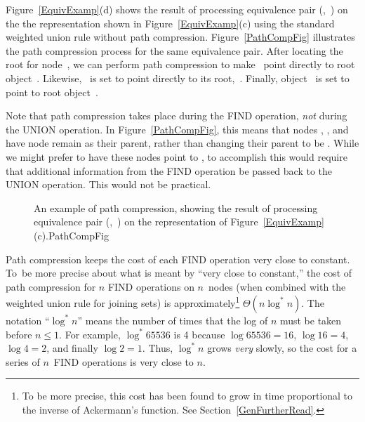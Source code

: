 \begin{example}
Figure~\ref{EquivExamp}(d) shows the result of processing equivalence
pair (,~) on the the representation shown in
Figure~\ref{EquivExamp}(c) using the standard weighted union rule
without path compression.
Figure~\ref{PathCompFig} illustrates the path compression process for
the same equivalence pair.
After locating the root for node~, we can perform path
compression to make~ point directly to root object~.
Likewise, ~is set to point directly to its root,~.
Finally, object~ is set to point to root object~.

Note that path compression takes place during the
FIND operation, \emph{not} during the UNION operation.
In Figure~\ref{PathCompFig}, this means that nodes ,
, and  have node  remain as their parent,
rather than changing their parent to be .
While we might prefer to have these nodes point to , to
accomplish this would require that additional information from the
FIND operation be passed back to the UNION operation.
This would not be practical.
\end{example}

\begin{figure}
\vspace{-\bigskipamount}\vspace{-\medskipamount}

{An example of path compression, showing the result of
processing equivalence pair (,~) on the representation
of Figure~\ref{EquivExamp}(c).}{PathCompFig}
\smallskip
\end{figure}

Path compression keeps the cost of each FIND operation very
close to constant.
To~be more precise about what is meant by ``very close to constant,''
the cost of path compression for \(n\) FIND operations on
\(n\)~nodes (when combined with the weighted union rule for joining
sets) is approximately\footnote{To be more precise, this cost has been
found to grow in time proportional to the inverse of Ackermann's
function.
See Section~\ref{GenFurtherRead}.}
\(\Theta(n \log^* n)\). 
The notation ``\(\log^* n\)'' means the number of times that
the log of \(n\) must be taken before \(n \leq 1\).
For example, \(\log^* 65536\) is 4 because
\(\log 65536 = 16\), \(\log 16 = 4\), \(\log 4 = 2\), and finally
\(\log 2 = 1\).
Thus, \(\log^* n\) grows \emph{very} slowly, so the cost for a series
of \(n\)~FIND operations is very close to \(n\).

